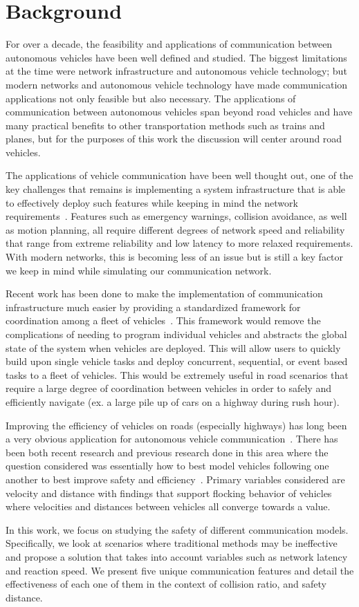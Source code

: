 \section{Background}

For over a decade, the feasibility and applications of communication between autonomous
vehicles have been well defined and studied. The biggest limitations at the time were
network infrastructure and autonomous vehicle technology; but modern networks and
autonomous vehicle technology have made communication applications not only feasible
but also necessary. The applications of communication between autonomous vehicles
span beyond road vehicles and have many practical benefits to other transportation methods
such as trains and planes, but for the purposes of this work the discussion will center
around road vehicles.

The applications of vehicle communication have been well thought out, one of the key
challenges that remains is implementing a system infrastructure that is able to
effectively deploy such features while keeping in mind the network requirements~\cite{willke2009survey}.
Features such as emergency warnings, collision avoidance, as well as motion planning,
all require different degrees of network speed and reliability that range from
extreme reliability and low latency to more relaxed requirements. With modern networks,
this is becoming less of an issue but is still a key factor we keep in mind while
simulating our communication network.

Recent work has been done to make
the implementation of communication infrastructure much easier by providing a standardized
framework for coordination among a fleet of vehicles~\cite{keila2018}.
This framework would remove
the complications of needing to program individual vehicles and abstracts the global
state of the system when vehicles are deployed. This will allow users to quickly build
upon single vehicle tasks and deploy concurrent, sequential, or event based tasks
to a fleet of vehicles. This would be extremely useful in road scenarios that require
a large degree of coordination between vehicles in order to safely and efficiently
navigate (ex. a large pile up of cars on a highway during rush hour).

Improving the efficiency of vehicles on roads (especially highways) has long been a
very obvious application for autonomous vehicle communication~\cite{murray2007recent}.
There has been both recent research and previous research done in this area where the question
considered was essentially how to best model vehicles following one another to best
improve safety and efficiency~\cite{ou2017extended, tanner2003coordination}.
Primary variables considered are velocity
and distance with findings that support flocking behavior of vehicles where velocities
and distances between vehicles all converge towards a value.

In this work, we focus on studying the safety of different communication models.
Specifically, we look at scenarios where traditional methods may be ineffective and propose
a solution that takes into account variables such as network latency and reaction speed.
We present five unique communication features and detail the effectiveness of each one of them
in the context of collision ratio, and safety distance.
